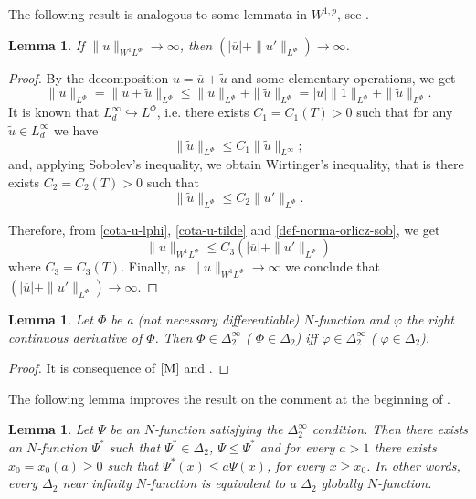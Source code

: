 \documentclass[twoside]{article}
\newtheorem{lem}[thm]{Lemma}
\theoremstyle{remark}
\newcommand{\orlnor}{\|_{L^{\Phi}}}
\newcommand{\lphi}{L^{\Phi}}
\newcommand{\sobnor}{\|_{W^{1}\lphi}}
\renewcommand{\leq}{\leqslant}
\renewcommand{\geq}{\geqslant}
\begin{document}
The following result is analogous to some lemmata in $W^{1,p}$, see \cite{xu2007some}.
\begin{lem}\label{infinito-a-prom-upunto}
If $\|u\sobnor\to \infty$, then $(|\overline{u}|+\|u'\orlnor)\to \infty$.
\end{lem}

\begin{proof}
By the decomposition $u=\overline{u}+\tilde{u}$ and some elementary operations,
we get
\begin{equation}\label{cota-u-lphi}
\|u\orlnor=
\|\overline{u}+\tilde{u}\orlnor\leq
\|\overline{u}\orlnor+\|\tilde{u}\orlnor=
|\overline{u}|\|1\orlnor+\|\tilde{u}\orlnor.
\end{equation}
It is known that $L^{\infty}_d\hookrightarrow\lphi$, i.e.
there exists $C_1=C_1(T)>0$ such that for any $\tilde{u}\in L^{\infty}_d$ we have
\[
\|\tilde{u}\orlnor
\leq
C_1 \|\tilde{u}\|_{L^{\infty}};
\]
and, applying  Sobolev's inequality,  we obtain Wirtinger's inequality, 
that is there exists $C_2=C_2(T)>0$ such that
\begin{equation}\label{cota-u-tilde}
\|\tilde{u}\orlnor
\leq
C_2\|u'\orlnor.
\end{equation}

Therefore, from \eqref{cota-u-lphi}, \eqref{cota-u-tilde} and \eqref{def-norma-orlicz-sob},
we get
\[
\|u\sobnor\leq
C_3(|\overline{u}|+\|u'\orlnor)
\]
where $C_3=C_3(T)$. Finally, as $\|u\sobnor\to \infty$ we conclude that
$(|\overline{u}|+\|u'\orlnor)\to \infty$.
\end{proof}

\begin{lem}\label{lema:delta_2 y der} Let $\Phi$ be a (not necessary differentiable) $N$-function and $\varphi$ the right continuous derivative of $\Phi$. Then $\Phi\in\Delta_2^{\infty}$ (
$\Phi\in\Delta_2$) iff $\varphi\in\Delta_2^{\infty}$ (
$\varphi\in\Delta_2$).
\end{lem}
\begin{proof}  It is consequence of $\cite[Th. 11.7]{M}$ and \cite[Remark 5, p. 87]{M}.

\end{proof}

The following lemma improves the result on the comment at the beginning of \cite[p. 24]{KR}.

\begin{lem}\label{lem:delta2-equiv-delta2-global} Let $\Psi$ be an $N$-function satisfying the $\Delta_2^{\infty}$ condition. Then there exists an $N$-function $\Psi^*$  such that $\Psi^*\in\Delta_2$, $\Psi\leq\Psi^*$ and for every $a>1$ there exists $x_0=x_0(a)\geq 0$ such that $\Psi^*(x)\leq a\Psi(x)$, for every $x\geq x_0$.  In other words,  every $\Delta_2$ near infinity  $N$-function is equivalent to a $\Delta_2$ globally $N$-function.
\end{lem}
\end{document}

